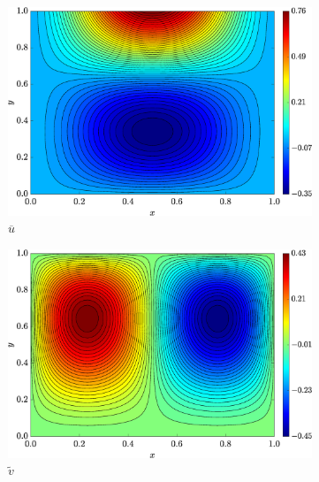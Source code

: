 \documentclass[preprint, 12pt]{elsarticle}
\begin{document}
\begin{figure}[H]
    \centering
    \begin{subfigure}[b]{.46\textwidth}
        \includegraphics[width=\textwidth]{Exact_Map_NormErr_2nd_Betann_0.1_Re_1_Wi_1_epsilon_0_xi_0_alphaG_0_Dt_1e-06_at_0.05_tipsim_1_MMS_12_U.eps}
        \caption{$\overline{u}$}
        \label{fig_solexaustreamlineCase1}
    \end{subfigure}
    \vspace{0.2cm}
    \begin{subfigure}[b]{.46\textwidth}
        \includegraphics[width=\textwidth]{Exact_Map_NormErr_2nd_Betann_0.1_Re_1_Wi_1_epsilon_0_xi_0_alphaG_0_Dt_1e-06_at_0.05_tipsim_1_MMS_12_V.eps}
        \caption{$\widetilde{v}$}
        \label{fig_solexavstreamlineCase1}
    \end{subfigure}
    \begin{subfigure}[b]{.46\textwidth}

\end{subfigure}
\end{figure}
\end{document}
